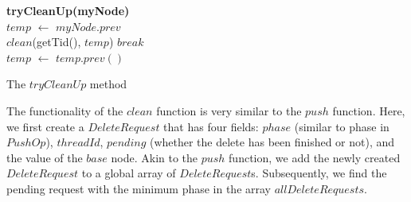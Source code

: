 \documentclass{llncs}
\begin{document}
\vspace{-7mm}
\begin{algorithm}
\scriptsize
\SetAlgoLined
\textbf{tryCleanUp(myNode)} \\
	$temp$ $\leftarrow$ $myNode.prev$\\
	{
		{
			{
				$clean$(getTid(), $temp$) \label{line:callclean}
			}
			$break$\\
		}
		$temp$ $\leftarrow$ $temp.prev()$\\
	}
\caption{The $tryCleanUp$ method} \label{alg:tryClean}
\end{algorithm}
\vspace{-7mm}
\begin{comment}
\begin{algorithm}
\scriptsize
\SetAlgoLined
\textbf{class DeleteRequest}{}\\
		\hspace{5mm}$long$ $phase$\\
		\hspace{5mm}$int$ $threadId$\\
		\hspace{5mm}$AtomicBoolean$ $pending$\\
        \hspace{5mm}$Node$ $node$ \\	

\vskip 1mm
AtomicReferenceArray$<$DeleteRequest$>$ allDeleteRequests

\caption{$DeleteRequest$ } \label{alg:deleteclasses}
\end{algorithm}
\end{comment}
The functionality of the $clean$ function is very similar to the $push$ function. 
Here, we first create a $DeleteRequest$ that has four fields: $phase$ (similar to phase in $PushOp$), 
$threadId$, $pending$ (whether the delete has been finished or not), and  the value of the $base$ node. 
Akin to the $push$ function, we add the newly created $DeleteRequest$ to a global array of $DeleteRequest$s.
Subsequently, we find the pending request with the minimum phase in the array $allDeleteRequests$. 
\end{document}
